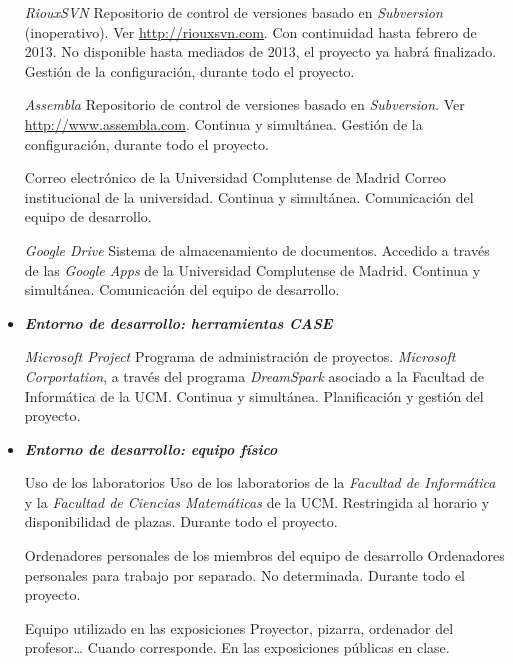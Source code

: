 \begin{itemize}
		{\textit{RiouxSVN}}
		{Repositorio de control de versiones basado en \textit{Subversion} (inoperativo).}
		{Ver \url{http://riouxsvn.com}.}
		{Con continuidad hasta febrero de 2013. No disponible hasta mediados de 2013, el proyecto ya habrá finalizado.}
		{Gestión de la configuración, durante todo el proyecto.}

		{\textit{Assembla}}
		{Repositorio de control de versiones basado en \textit{Subversion}.}
		{Ver \url{http://www.assembla.com}.}
		{Continua y simultánea.}
		{Gestión de la configuración, durante todo el proyecto.}

		{Correo electrónico de la Universidad Complutense de Madrid}
		{Correo institucional de la universidad.}
		{}
		{Continua y simultánea.}
		{Comunicación del equipo de desarrollo.}

		{\textit{Google Drive}}
		{Sistema de almacenamiento de documentos. Accedido a través de las \textit{Google Apps} de la Universidad Complutense de Madrid.}
		{}
		{Continua y simultánea.}
		{Comunicación del equipo de desarrollo.}

	\bigskip
	\item {\itshape \bfseries Entorno de desarrollo: herramientas CASE} \\ \medskip

		{\textit{Microsoft Project}}
		{Programa de administración de proyectos.}
		{\textit{Microsoft Corportation}, a través del programa \textit{DreamSpark} asociado a la Facultad de Informática de la UCM.}
		{Continua y simultánea.}
		{Planificación y gestión del proyecto.}

	\bigskip
	\item {\itshape \bfseries Entorno de desarrollo: equipo físico} \\ \medskip

		{Uso de los laboratorios}
		{Uso de los laboratorios de la \textit{Facultad de Informática} y la \textit{Facultad de Ciencias Matemáticas} de la UCM.}
		{}
		{Restringida al horario y disponibilidad de plazas.}
		{Durante todo el proyecto.}

		{Ordenadores personales de los miembros del equipo de desarrollo}
		{Ordenadores personales para trabajo por separado.}
		{}
		{No determinada.}
		{Durante todo el proyecto.}

		{Equipo utilizado en las exposiciones}
		{Proyector, pizarra, ordenador del profesor\ldots}
		{}
		{Cuando corresponde.}
		{En las exposiciones públicas en clase.}


\end{itemize}
